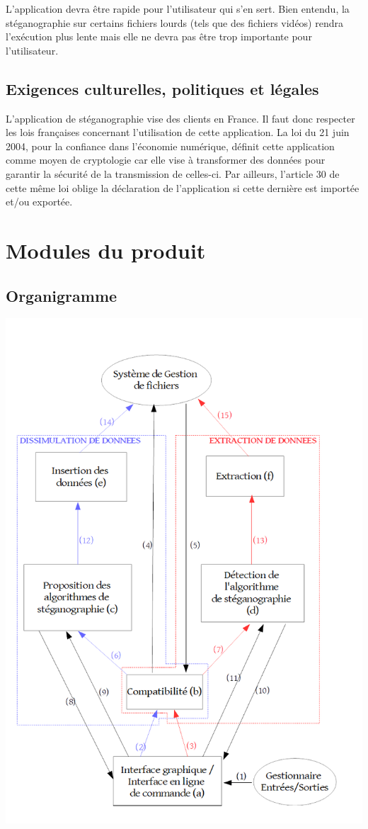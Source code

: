 \documentclass[11pt]{article}
\begin{document}
L'application devra être rapide pour l'utilisateur qui s'en sert. Bien entendu,
la stéganographie sur certains fichiers lourds (tels que des fichiers vidéos)
rendra l'exécution plus lente mais elle ne devra pas être trop importante pour
l'utilisateur. 

\subsection{Exigences culturelles, politiques et légales}

L'application de stéganographie vise des clients en France. Il faut donc
respecter les lois françaises concernant l'utilisation de cette application. La
loi du 21 juin 2004, pour la confiance dans l'économie numérique, définit cette
application comme moyen de cryptologie car elle vise à transformer des données
pour garantir la sécurité de la transmission de celles-ci. Par ailleurs,
l'article 30 de cette même loi oblige la déclaration de l'application si cette
dernière est importée et/ou exportée. 

\section{Modules du produit}

\subsection{Organigramme}

\newpage

\includegraphics[scale=0.55]{Pictures/organigramme.png}
\end{document}
